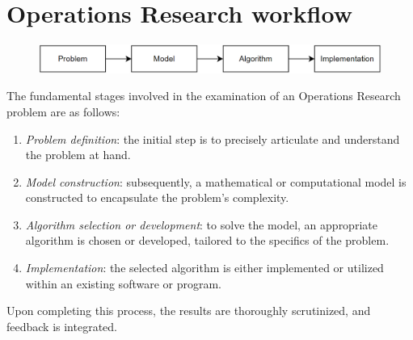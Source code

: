 \section{Operations Research workflow}

\begin{figure}[H]
    \centering
    \includegraphics[width=1\linewidth]{images/study.png}
\end{figure}
The fundamental stages involved in the examination of an Operations Research problem are as follows:
\begin{enumerate}
    \item \textit{Problem definition}: the initial step is to precisely articulate and understand the problem at hand.
    \item \textit{Model construction}: subsequently, a mathematical or computational model is constructed to encapsulate the problem's complexity.
    \item \textit{Algorithm selection or development}: to solve the model, an appropriate algorithm is chosen or developed, tailored to the specifics of the problem.
    \item \textit{Implementation}: the selected algorithm is either implemented or utilized within an existing software or program.
\end{enumerate}
Upon completing this process, the results are thoroughly scrutinized, and feedback is integrated.

